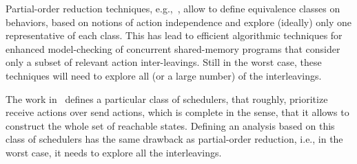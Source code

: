Partial-order reduction techniques, e.g.,~\cite{DBLP:conf/popl/AbdullaAJS14,DBLP:conf/popl/FlanaganG05}, allow to define equivalence classes on behaviors, based on notions of action independence and explore (ideally) only one representative of each class. This has lead to efficient algorithmic techniques for enhanced model-checking of concurrent shared-memory programs that consider only a subset of relevant action inter-leavings. Still in the worst case, these techniques will need to explore all (or a large number) of the interleavings. 

The work in~\cite{DBLP:conf/oopsla/Desai0M14} defines a particular class of schedulers, that roughly, prioritize receive actions over send actions, which is complete in the sense, that it allows to construct the whole set of reachable states. Defining an analysis based on this class of schedulers has the same drawback as partial-order reduction, i.e., in the worst case, it needs to explore all the interleavings.
